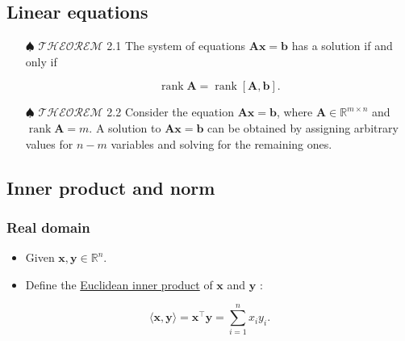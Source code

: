 \documentclass[12pt,thmsa]{article}
\begin{document}
\subsection{Linear equations}
\begin{itemize}
	\item[\(\spadesuit\)] \(\mathscr{THEOREM}\) 2.1 The system of equations \(\boldsymbol{A} \boldsymbol{x}=\boldsymbol{b}\) has a solution if and only if
	
	\begin{equation*}
		\operatorname{rank} \boldsymbol{A}=\operatorname{rank}[\boldsymbol{A}, \boldsymbol{b}] .
	\end{equation*}

	\item[\(\spadesuit\)] \(\mathscr{THEOREM}\) 2.2 Consider the equation \(\boldsymbol{A x}=\boldsymbol{b}\), where \(\boldsymbol{A} \in \mathbb{R}^{m \times n}\) and \(\operatorname{rank} \boldsymbol{A}=m\). A solution to \(\boldsymbol{A} \boldsymbol{x}=\boldsymbol{b}\) can be obtained by assigning arbitrary values for \(n-m\) variables and solving for the remaining ones.
\end{itemize}	

\subsection{Inner product and norm}
\subsubsection{Real domain}
\begin{itemize}
	\item Given \(\boldsymbol{x}, \boldsymbol{y} \in \mathbb{R}^{n}\).
	
	\item Define the \underline{Euclidean inner product} of \(\boldsymbol{x}\) and \(\boldsymbol{y}\) :
	
\end{itemize}

\begin{equation*}
	\langle\boldsymbol{x}, \boldsymbol{y}\rangle=\boldsymbol{x}^{\top} \boldsymbol{y}=\sum_{i=1}^{n} x_{i} y_{i}.
\end{equation*}
\end{document}
